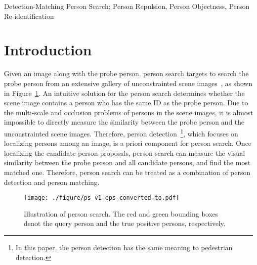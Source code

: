 \documentclass[journal]{IEEEtran}
\begin{document}
\begin{IEEEkeywords}
Detection-Matching Person Search; Person Repulsion, Person Objectness, Person Re-identification
\end{IEEEkeywords}

\IEEEpeerreviewmaketitle

\section{Introduction}
Given an image along with the probe person, person search targets to search the probe person from an extensive gallery of unconstrainted scene images~\cite{XiaoLWLW17}, as shown in Figure~\ref{Fig:ps}.
An intuitive solution for the person search determines whether the scene image contains a person who has the same ID as the probe person.
Due to the multi-scale and occlusion problems of persons in the scene images, it is almost impossible to directly measure the similarity between the probe person and the unconstrainted scene images.
Therefore, person detection~\footnote{In this paper, the person detection has the same meaning to pedestrian detection.}, which focuses on localizing persons among an image, is a priori component for person search.
Once localizing the candidate person proposals, person search can measure the visual similarity between the probe person and all candidate persons, and find the most matched one.
Therefore, person search can be treated as a combination of person detection and person matching. 

\begin{figure}
\centering
\texttt{[image: ./figure/ps\_v1-eps-converted-to.pdf]}
\caption{Illustration of person search. The red and green bounding boxes denot the query person and the true positive persons, respectively.}
\label{Fig:ps}
\vspace{-0.28cm}
\end{figure}
\end{document}
